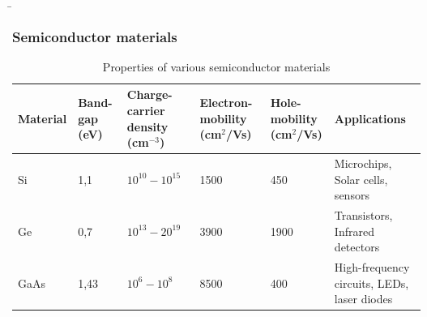 \begin{frame}
    \renewcommand{\tablename}{Table}
    \b{
        \frametitle{Semiconductor materials}
        \begin{table}[H]
            \centering 
            \begin{tabular}{|p{1.7cm}|p{1.2cm}|p{2cm}|p{2.2cm}|p{2.2cm}|p{2.3cm}|}
                \hline
                \textbf{Material} & \textbf{Band- \newline gap \newline (eV)} & \textbf{Charge- \newline carrier density \newline (cm$^{-3}$)} & \textbf{Electron- \newline mobility \newline (cm$^2$/Vs)} & \textbf{Hole- \newline mobility \newline (cm$^2$/Vs)} & \textbf{Applications}\\
                \hline
                Si  & 1,1 & $10^{10} - 10^{15}$ & 1500 & 450 & Microchips, \newline Solar cells, sensors \\
                \hline
                Ge & 0,7 & $10^{13} - 20^{19}$ & 3900 & 1900 & Transistors, \newline Infrared detectors \\
                \hline
                GaAs & 1,43 & $10^6 - 10^8$ & 8500 & 400 & High-frequency circuits, LEDs, laser diodes \\
                \hline
                \end{tabular}
                \caption{Properties of various semiconductor materials}
        \end{table}
    }

\end{frame}


